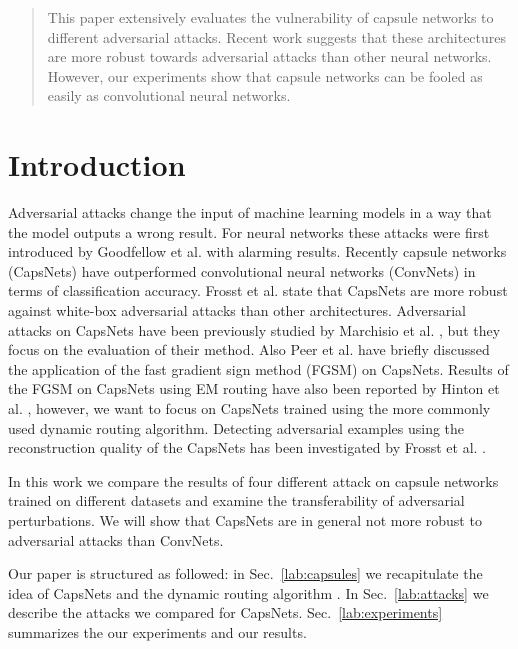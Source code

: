 \documentclass{article}
\begin{document}
\printAffiliationsAndNotice{\icmlEqualContribution} %

\begin{abstract}
	This paper extensively evaluates the vulnerability of capsule networks to different adversarial attacks. Recent work suggests that these architectures are more robust towards adversarial attacks than other neural networks. However, our experiments show that capsule networks can be fooled as easily as convolutional neural networks.
\end{abstract}

\section{Introduction}
Adversarial attacks change the input of machine learning models in a way that the model outputs a wrong result. For neural networks these attacks were first introduced by Goodfellow et al.  with alarming results. Recently capsule networks (CapsNets) \cite{capsules} have outperformed convolutional neural networks (ConvNets) in terms of classification accuracy. Frosst et al.  state that CapsNets are more robust against white-box adversarial attacks than other architectures. Adversarial attacks on CapsNets have been previously studied by Marchisio et al. , but they focus on the evaluation of their method. Also Peer et al.  have briefly discussed the application of the fast gradient sign method (FGSM) \cite{fgsm} on CapsNets. Results of the FGSM on CapsNets using EM routing have also been reported by Hinton et al. , however, we want to focus on CapsNets trained using the more commonly used dynamic routing algorithm. Detecting adversarial examples using the reconstruction quality of the CapsNets has been investigated by Frosst et al. . 

In this work we compare the results of four different attack on capsule networks trained on different datasets and examine the transferability of adversarial perturbations. We will show that CapsNets are in general not more robust to adversarial attacks than ConvNets.

Our paper is structured as followed: in Sec.~\ref{lab:capsules} we
recapitulate the idea of CapsNets and the dynamic routing algorithm
\cite{capsules}. In Sec.~\ref{lab:attacks} we describe the attacks
we compared for CapsNets. Sec.~\ref{lab:experiments} summarizes the our experiments and our results.
\end{document}
